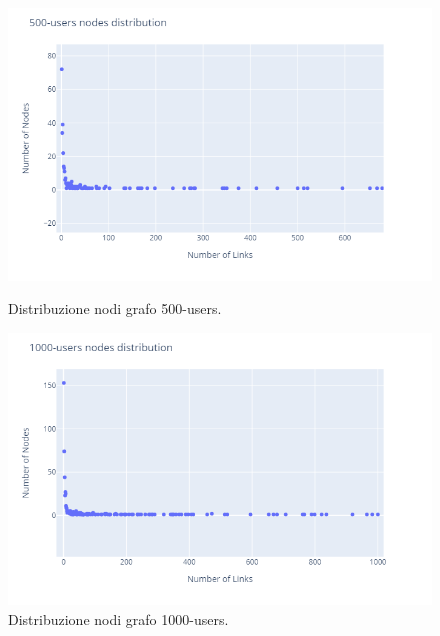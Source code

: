     \begin{figure}[!htbp]
        \centering
        \begin{minipage}[b]{0.49\textwidth}
            \includegraphics[width=\textwidth]{resources/charts/500_users_nodes.png}
            \caption{Distribuzione nodi grafo 500-users.}
        \end{minipage}
        \hfill
        \begin{minipage}[b]{0.49\textwidth}
            \includegraphics[width=\textwidth]{resources/charts/1000_users_nodes.png}
            \caption{Distribuzione nodi grafo 1000-users.}
        \end{minipage}
    \end{figure}
    
